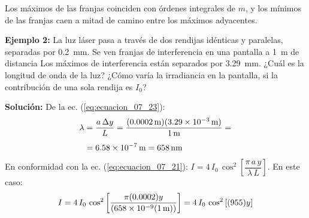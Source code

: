 \documentclass[14pt]{extarticle}
\begin{document}
Los máximos de las franjas coinciden con órdenes integrales de $m$, y los mínimos de las franjas caen a mitad de camino entre los máximos adyacentes.
\par
\noindent
\textbf{Ejemplo 2:} La luz láser pasa a través de dos rendijas idénticas y paralelas, separadas por \SI{0.2}{\milli\meter}. Se ven franjas de interferencia en una pantalla a \SI{1}{\meter} de distancia Los máximos de interferencia están separados por \SI{3.29}{\milli\meter}. ¿Cuál es la longitud de onda de la luz? ¿Cómo varía la irradiancia en la pantalla, si la contribución de una sola rendija es $I_{0}$?

\noindent
\textbf{Solución:} De la ec. (\ref{eq:ecuacion_07_23}):
\begin{align*}
\lambda &= \dfrac{a \, \Delta y}{L} = \dfrac{(\SI{0.0002}{\meter})(\SI{3.29d-3}{\meter})}{\SI{1}{\meter}} = \\[0.5em]
&= \SI{6.58d-7}{\meter} = \SI{658}{\nano\meter}
\end{align*}
En conformidad con la ec. (\ref{eq:ecuacion_07_21}): $I = 4 \, I_{0} \, \cos^{2} \left[ \dfrac{\pi \,a \, y}{\lambda \, L} \right]$. En este caso:
\begin{align*}
I = 4 \, I_{0} \, \cos^{2} \left[ \dfrac{\pi (0.0002) y}{(\num{658d-9}(\SI{1}{\meter}))} \right] = 4 \, I_{0} \, \cos^{2} \left[ (955) y \right]
\end{align*}
\end{document}
